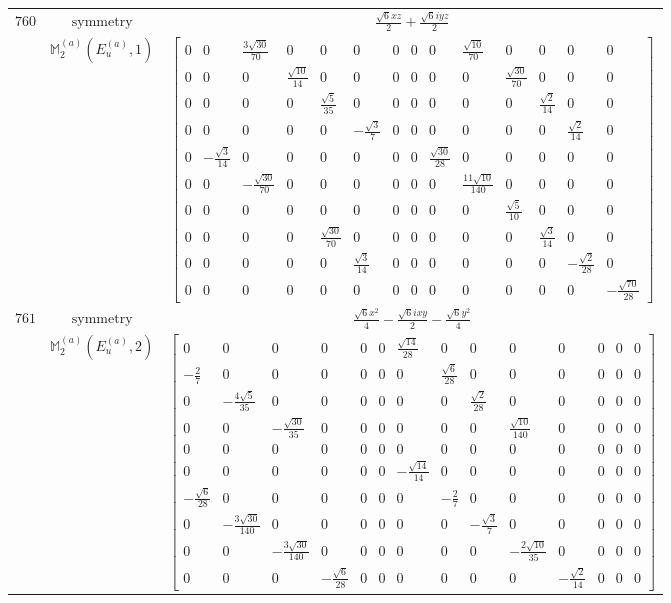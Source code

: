 \documentclass[fleqn,8pt,landscape]{jsarticle}
\begin{document}
\begin{longtable}{ccc}
$ 760 $ & $ \text{symmetry} $ & $ \frac{\sqrt{6} x z}{2} + \frac{\sqrt{6} i y z}{2} $ \\
$  $ & $ \mathbb{M}_{2}^{(a)}(E_{u}^{(a)},1) $ & $ \begin{bmatrix} 0 & 0 & \frac{3 \sqrt{30}}{70} & 0 & 0 & 0 & 0 & 0 & 0 & \frac{\sqrt{10}}{70} & 0 & 0 & 0 & 0 \\ 0 & 0 & 0 & \frac{\sqrt{10}}{14} & 0 & 0 & 0 & 0 & 0 & 0 & \frac{\sqrt{30}}{70} & 0 & 0 & 0 \\ 0 & 0 & 0 & 0 & \frac{\sqrt{5}}{35} & 0 & 0 & 0 & 0 & 0 & 0 & \frac{\sqrt{2}}{14} & 0 & 0 \\ 0 & 0 & 0 & 0 & 0 & - \frac{\sqrt{3}}{7} & 0 & 0 & 0 & 0 & 0 & 0 & \frac{\sqrt{2}}{14} & 0 \\ 0 & - \frac{\sqrt{3}}{14} & 0 & 0 & 0 & 0 & 0 & 0 & \frac{\sqrt{30}}{28} & 0 & 0 & 0 & 0 & 0 \\ 0 & 0 & - \frac{\sqrt{30}}{70} & 0 & 0 & 0 & 0 & 0 & 0 & \frac{11 \sqrt{10}}{140} & 0 & 0 & 0 & 0 \\ 0 & 0 & 0 & 0 & 0 & 0 & 0 & 0 & 0 & 0 & \frac{\sqrt{5}}{10} & 0 & 0 & 0 \\ 0 & 0 & 0 & 0 & \frac{\sqrt{30}}{70} & 0 & 0 & 0 & 0 & 0 & 0 & \frac{\sqrt{3}}{14} & 0 & 0 \\ 0 & 0 & 0 & 0 & 0 & \frac{\sqrt{3}}{14} & 0 & 0 & 0 & 0 & 0 & 0 & - \frac{\sqrt{2}}{28} & 0 \\ 0 & 0 & 0 & 0 & 0 & 0 & 0 & 0 & 0 & 0 & 0 & 0 & 0 & - \frac{\sqrt{70}}{28} \end{bmatrix} $ \\ \hline
$ 761 $ & $ \text{symmetry} $ & $ \frac{\sqrt{6} x^{2}}{4} - \frac{\sqrt{6} i x y}{2} - \frac{\sqrt{6} y^{2}}{4} $ \\
$  $ & $ \mathbb{M}_{2}^{(a)}(E_{u}^{(a)},2) $ & $ \begin{bmatrix} 0 & 0 & 0 & 0 & 0 & 0 & \frac{\sqrt{14}}{28} & 0 & 0 & 0 & 0 & 0 & 0 & 0 \\ - \frac{2}{7} & 0 & 0 & 0 & 0 & 0 & 0 & \frac{\sqrt{6}}{28} & 0 & 0 & 0 & 0 & 0 & 0 \\ 0 & - \frac{4 \sqrt{5}}{35} & 0 & 0 & 0 & 0 & 0 & 0 & \frac{\sqrt{2}}{28} & 0 & 0 & 0 & 0 & 0 \\ 0 & 0 & - \frac{\sqrt{30}}{35} & 0 & 0 & 0 & 0 & 0 & 0 & \frac{\sqrt{10}}{140} & 0 & 0 & 0 & 0 \\ 0 & 0 & 0 & 0 & 0 & 0 & 0 & 0 & 0 & 0 & 0 & 0 & 0 & 0 \\ 0 & 0 & 0 & 0 & 0 & 0 & - \frac{\sqrt{14}}{14} & 0 & 0 & 0 & 0 & 0 & 0 & 0 \\ - \frac{\sqrt{6}}{28} & 0 & 0 & 0 & 0 & 0 & 0 & - \frac{2}{7} & 0 & 0 & 0 & 0 & 0 & 0 \\ 0 & - \frac{3 \sqrt{30}}{140} & 0 & 0 & 0 & 0 & 0 & 0 & - \frac{\sqrt{3}}{7} & 0 & 0 & 0 & 0 & 0 \\ 0 & 0 & - \frac{3 \sqrt{30}}{140} & 0 & 0 & 0 & 0 & 0 & 0 & - \frac{2 \sqrt{10}}{35} & 0 & 0 & 0 & 0 \\ 0 & 0 & 0 & - \frac{\sqrt{6}}{28} & 0 & 0 & 0 & 0 & 0 & 0 & - \frac{\sqrt{2}}{14} & 0 & 0 & 0 \end{bmatrix} $ \\ \hline

\end{longtable}
\end{document}
